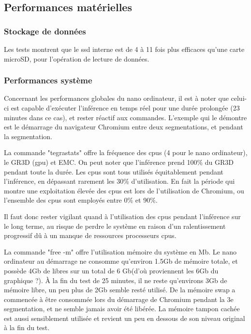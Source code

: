 ﻿\subsection{Performances matérielles}
\subsubsection{Stockage de données}
\par Les tests montrent que le \acrshort{ssd} interne est de 4 à 11 fois plus efficaces qu'une carte microSD, pour l'opération de lecture de données. 
\subsubsection{Performances système}
\par Concernant les performances globales du nano ordinateur, il est à noter que celui-ci est capable d'exécuter l'inférence en temps réel pour une durée prolongée (23 minutes dans ce cas), et rester réactif aux commandes. L'exemple qui le démontre est le démarrage du navigateur Chromium entre deux segmentations, et pendant la segmentation.
\par La commande "tegrastats" offre la fréquence des \acrshort{cpu}s (4 pour le nano ordinateur), le GR3D (\acrshort{gpu}) et EMC. On peut noter que l'inférence prend 100\% du GR3D pendant toute la durée. Les \acrshort{cpu}s sont tous utilisés équitablement pendant l'inférence, en dépassant rarement les 30\% d'utilisation. En fait la période qui montre une exploitation élevée des \acrshort{cpu}s est lors de l'utilisation de Chromium, ou l'ensemble des \acrshort{cpu}s sont employés entre 0\% et 90\%. 
\par Il faut donc rester vigilant quand à l'utilisation des \acrshort{cpu}s pendant l'inférence sur le long terme, au risque de perdre le système en raison d'un ralentissement progressif dû à un manque de ressources processeurs \acrshort{cpu}s.
\par La commande "free -m" offre l'utilisation mémoire du système en Mb. Le nano ordinateur au démarrage ne consomme qu'environ 1.5Gb de mémoire totale, et possède 4Gb de libres sur un total de 6 Gb(d'où proviennent les 6Gb du graphique ?). À la fin du test de 25 minutes, il ne reste qu'environs 3Gb de mémoire libre, un peu plus de 2Gb semble resté utilisé. De la mémoire swap a commencée à être consommée lors du démarrage de Chromium pendant la 3e segmentation, et ne semble jamais avoir été libérée. La mémoire tampon cachée est aussi sensiblement utilisée et revient un peu en dessous de son niveau original à la fin du test. 
